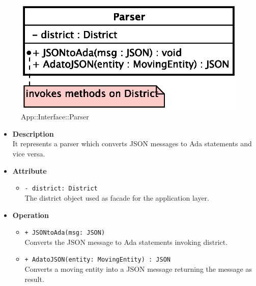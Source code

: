 \begin{figure}[h]
\centering
\includegraphics[scale=0.6,keepaspectratio]{images/solution/parser.eps}
\caption{App::Interface::Parser}
\label{fig:sd-app-parser}
\end{figure}
\FloatBarrier
\begin{itemize}
  \item \textbf{Description} \\
    It represents a parser which converts JSON messages to Ada statements and vice versa.
  \item \textbf{Attribute}
  \begin{itemize}
    \item \texttt{- district: District} \\
The district object used as facade for the application layer.
  \end{itemize}
  \item \textbf{Operation}
  \begin{itemize} 
    \item \texttt{+ JSONtoAda(msg: JSON)} \\
Converts the JSON message to Ada statements invoking district.
    \item \texttt{+ AdatoJSON(entity: MovingEntity) : JSON} \\
Converts a moving entity into a JSON message returning the message as result.
  \end{itemize}
\end{itemize}

